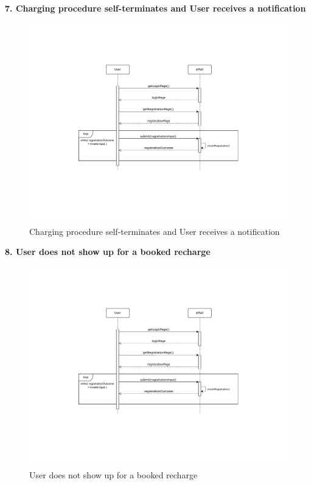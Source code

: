\documentclass[11pt]{article}
\begin{document}
\begin{description}
    \item \textbf{7. Charging procedure self-terminates and User receives a notification}
    \begin{figure}[!ht]
        \centering
        \includegraphics[page={7}, trim=1cm 11cm 0.2cm 3cm, width=\linewidth, clip]{SequenceDiagrams.pdf}
        \caption{Charging procedure self-terminates and User receives a notification}
    \end{figure}
    
    \item \textbf{8. User does not show up for a booked recharge}
    \begin{figure}[!ht]
        \centering
        \includegraphics[page={8}, trim=11cm 12.3cm 8cm 4cm, width=0.3\linewidth, clip]{SequenceDiagrams.pdf}
        \caption{User does not show up for a booked recharge}
    \end{figure}
    

\end{description}
\end{document}
